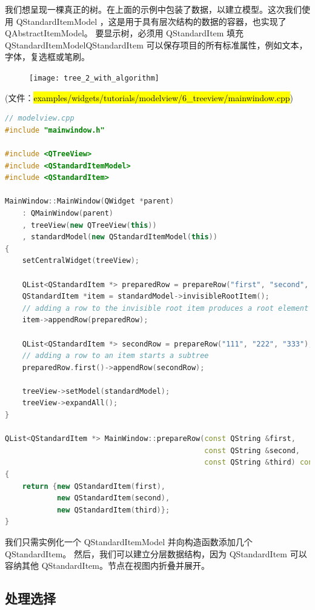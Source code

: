 我们想呈现一棵真正的树。在上面的示例中包装了数据，以建立模型。这次我们使用 QStandardItemModel ，这是用于具有层次结构的数据的容器，也实现了 QAbstractItemModel。
要显示树，必须用 QStandardItem 填充 QStandardItemModelQStandardItem 可以保存项目的所有标准属性，例如文本，字体，复选框或笔刷。

\begin{figure}[hbt!]  
\texttt{[image: tree\_2\_with\_algorithm]}
\end{figure}

(文件：\hl{examples/widgets/tutorials/modelview/6\_treeview/mainwindow.cpp})

\begin{lstlisting}[language=C++]
// modelview.cpp
#include "mainwindow.h"

#include <QTreeView>
#include <QStandardItemModel>
#include <QStandardItem>

MainWindow::MainWindow(QWidget *parent)
    : QMainWindow(parent)
    , treeView(new QTreeView(this))
    , standardModel(new QStandardItemModel(this))
{
    setCentralWidget(treeView);

    QList<QStandardItem *> preparedRow = prepareRow("first", "second", "third");
    QStandardItem *item = standardModel->invisibleRootItem();
    // adding a row to the invisible root item produces a root element
    item->appendRow(preparedRow);

    QList<QStandardItem *> secondRow = prepareRow("111", "222", "333");
    // adding a row to an item starts a subtree
    preparedRow.first()->appendRow(secondRow);

    treeView->setModel(standardModel);
    treeView->expandAll();
}

QList<QStandardItem *> MainWindow::prepareRow(const QString &first,
                                              const QString &second,
                                              const QString &third) const
{
    return {new QStandardItem(first),
            new QStandardItem(second),
            new QStandardItem(third)};
}
\end{lstlisting}

我们只需实例化一个 QStandardItemModel 并向构造函数添加几个 QStandardItem。
然后，我们可以建立分层数据结构，因为 QStandardItem 可以容纳其他 QStandardItem。节点在视图内折叠并展开。

\subsection{处理选择}

